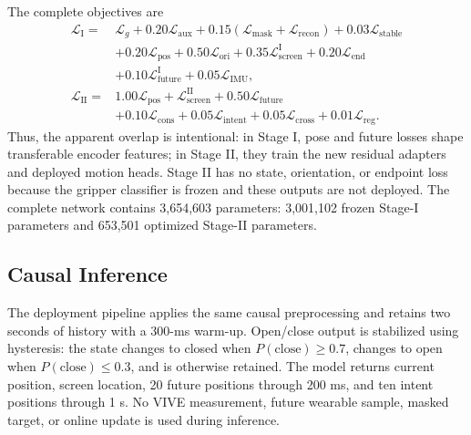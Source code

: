 The complete objectives are
\begin{align}
 \mathcal L_{\mathrm I}={}&
 \mathcal L_g+0.20\mathcal L_{\mathrm{aux}}
 +0.15(\mathcal L_{\mathrm{mask}}+\mathcal L_{\mathrm{recon}})
 +0.03\mathcal L_{\mathrm{stable}} \nonumber\\
 &+0.20\mathcal L_{\mathrm{pos}}+0.50\mathcal L_{\mathrm{ori}}
 +0.35\mathcal L_{\mathrm{screen}}^{\mathrm I}
 +0.20\mathcal L_{\mathrm{end}} \nonumber\\
 &+0.10\mathcal L_{\mathrm{future}}^{\mathrm I}
 +0.05\mathcal L_{\mathrm{IMU}},\\[2mm]
 \mathcal L_{\mathrm{II}}={}&
 1.00\mathcal L_{\mathrm{pos}}
 +\mathcal L_{\mathrm{screen}}^{\mathrm{II}}
 +0.50\mathcal L_{\mathrm{future}} \nonumber\\
 &+0.10\mathcal L_{\mathrm{cons}}
 +0.05\mathcal L_{\mathrm{intent}}
 +0.05\mathcal L_{\mathrm{cross}}
 +0.01\mathcal L_{\mathrm{reg}}.
\end{align}
Thus, the apparent overlap is intentional: in Stage I, pose and future losses
shape transferable encoder features; in Stage II, they train the new residual
adapters and deployed motion heads. Stage II has no state, orientation, or
endpoint loss because the gripper classifier is frozen and these outputs are
not deployed. The complete network contains 3,654,603 parameters: 3,001,102
frozen Stage-I parameters and 653,501 optimized Stage-II parameters.

\subsection{Causal Inference}

The deployment pipeline applies the same causal preprocessing and retains two
seconds of history with a 300-ms warm-up. Open/close output is stabilized using
hysteresis: the state changes to closed when $P(\mathrm{close})\geq0.7$, changes
to open when $P(\mathrm{close})\leq0.3$, and is otherwise retained. The model
returns current position, screen location, 20 future positions through 200 ms,
and ten intent positions through 1 s. No VIVE measurement, future wearable
sample, masked target, or online update is used during inference.
